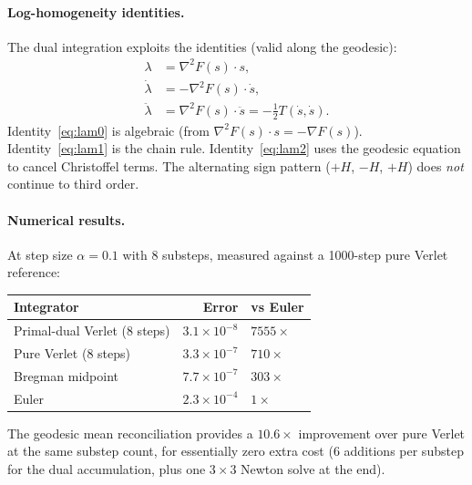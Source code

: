 \documentclass[11pt]{article}
\begin{document}
\paragraph{Log-homogeneity identities.}
The dual integration exploits the identities (valid along the geodesic):
\begin{align}
  \lambda &= \nabla^2 F(s) \cdot s, \label{eq:lam0} \\
  \dot{\lambda} &= -\nabla^2 F(s) \cdot \dot{s}, \label{eq:lam1} \\
  \ddot{\lambda} &= \nabla^2 F(s) \cdot \ddot{s}
    = -\tfrac{1}{2} T(\dot{s}, \dot{s}). \label{eq:lam2}
\end{align}
Identity~\eqref{eq:lam0} is algebraic (from $\nabla^2 F(s) \cdot s = -\nabla F(s)$).
Identity~\eqref{eq:lam1} is the chain rule.
Identity~\eqref{eq:lam2} uses the geodesic equation to cancel Christoffel terms.
The alternating sign pattern ($+H$, $-H$, $+H$) does \emph{not} continue
to third order.

\paragraph{Numerical results.}
At step size $\alpha = 0.1$ with 8 substeps, measured against a
1000-step pure Verlet reference:
\begin{center}
\begin{tabular}{@{}lrl@{}}
\toprule
\textbf{Integrator} & \textbf{Error} & \textbf{vs Euler} \\
\midrule
Primal-dual Verlet (8 steps) & $3.1 \times 10^{-8}$ & $7555\times$ \\
Pure Verlet (8 steps)        & $3.3 \times 10^{-7}$ & $710\times$ \\
Bregman midpoint             & $7.7 \times 10^{-7}$ & $303\times$ \\
Euler                        & $2.3 \times 10^{-4}$ & $1\times$ \\
\bottomrule
\end{tabular}
\end{center}
The geodesic mean reconciliation provides a $10.6\times$ improvement over
pure Verlet at the same substep count, for essentially zero extra cost
(6 additions per substep for the dual accumulation, plus one $3 \times 3$
Newton solve at the end).
\end{document}
